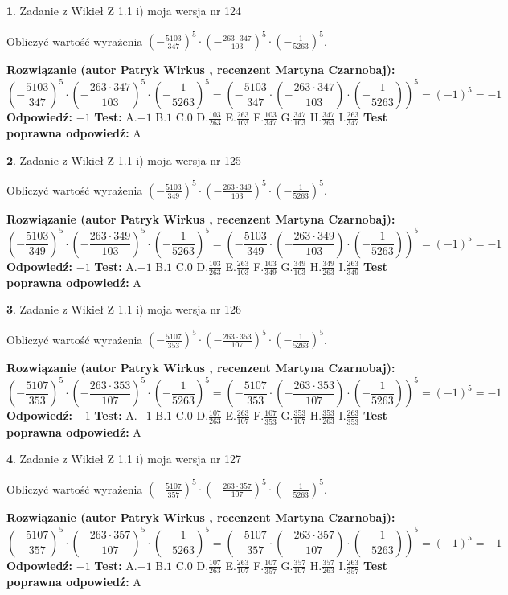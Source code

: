 \documentclass[12pt, a4paper]{article}
\theoremstyle{definition} %
\newtheorem{zad}{}
\newcommand{\zadStart}[1]{\begin{zad}#1\newline}
\newcommand{\zadStop}{\end{zad}}
\newcommand{\rozwStart}[2]{\noindent \textbf{Rozwiązanie (autor #1 , recenzent #2): }\newline}
\newcommand{\rozwStop}{\newline}
\newcommand{\odpStart}{\noindent \textbf{Odpowiedź:}\newline}
\newcommand{\odpStop}{\newline}
\newcommand{\testStart}{\noindent \textbf{Test:}\newline}
\newcommand{\testStop}{\newline}
\newcommand{\kluczStart}{\noindent \textbf{Test poprawna odpowiedź:}\newline}
\newcommand{\kluczStop}{\newline}
\begin{document}
\zadStart{Zadanie z Wikieł Z 1.1 i) moja wersja nr 124}

Obliczyć wartość wyrażenia $(-\frac{5103}{347})^{5} \cdot (-\frac{263 \cdot 347}{103})^{5} \cdot (-\frac{1}{5263})^{5}$.
\zadStop
\rozwStart{Patryk Wirkus}{Martyna Czarnobaj}
$$(-\frac{5103}{347})^{5} \cdot (-\frac{263 \cdot 347}{103})^{5} \cdot (-\frac{1}{5263})^{5} = (-\frac{5103}{347} \cdot (-\frac{263 \cdot 347}{103}) \cdot (-\frac{1}{5263}))^{5} = (-1)^{5} = -1$$
\rozwStop
\odpStart
$-1$
\odpStop
\testStart
A.$-1$ B.$1$ C.$0$ D.$\frac{103}{263}$ E.$\frac{263}{103}$
F.$\frac{103}{347}$ G.$\frac{347}{103}$
H.$\frac{347}{263}$
I.$\frac{263}{347}$
\testStop
\kluczStart
A
\kluczStop



\zadStart{Zadanie z Wikieł Z 1.1 i) moja wersja nr 125}

Obliczyć wartość wyrażenia $(-\frac{5103}{349})^{5} \cdot (-\frac{263 \cdot 349}{103})^{5} \cdot (-\frac{1}{5263})^{5}$.
\zadStop
\rozwStart{Patryk Wirkus}{Martyna Czarnobaj}
$$(-\frac{5103}{349})^{5} \cdot (-\frac{263 \cdot 349}{103})^{5} \cdot (-\frac{1}{5263})^{5} = (-\frac{5103}{349} \cdot (-\frac{263 \cdot 349}{103}) \cdot (-\frac{1}{5263}))^{5} = (-1)^{5} = -1$$
\rozwStop
\odpStart
$-1$
\odpStop
\testStart
A.$-1$ B.$1$ C.$0$ D.$\frac{103}{263}$ E.$\frac{263}{103}$
F.$\frac{103}{349}$ G.$\frac{349}{103}$
H.$\frac{349}{263}$
I.$\frac{263}{349}$
\testStop
\kluczStart
A
\kluczStop



\zadStart{Zadanie z Wikieł Z 1.1 i) moja wersja nr 126}

Obliczyć wartość wyrażenia $(-\frac{5107}{353})^{5} \cdot (-\frac{263 \cdot 353}{107})^{5} \cdot (-\frac{1}{5263})^{5}$.
\zadStop
\rozwStart{Patryk Wirkus}{Martyna Czarnobaj}
$$(-\frac{5107}{353})^{5} \cdot (-\frac{263 \cdot 353}{107})^{5} \cdot (-\frac{1}{5263})^{5} = (-\frac{5107}{353} \cdot (-\frac{263 \cdot 353}{107}) \cdot (-\frac{1}{5263}))^{5} = (-1)^{5} = -1$$
\rozwStop
\odpStart
$-1$
\odpStop
\testStart
A.$-1$ B.$1$ C.$0$ D.$\frac{107}{263}$ E.$\frac{263}{107}$
F.$\frac{107}{353}$ G.$\frac{353}{107}$
H.$\frac{353}{263}$
I.$\frac{263}{353}$
\testStop
\kluczStart
A
\kluczStop



\zadStart{Zadanie z Wikieł Z 1.1 i) moja wersja nr 127}

Obliczyć wartość wyrażenia $(-\frac{5107}{357})^{5} \cdot (-\frac{263 \cdot 357}{107})^{5} \cdot (-\frac{1}{5263})^{5}$.
\zadStop
\rozwStart{Patryk Wirkus}{Martyna Czarnobaj}
$$(-\frac{5107}{357})^{5} \cdot (-\frac{263 \cdot 357}{107})^{5} \cdot (-\frac{1}{5263})^{5} = (-\frac{5107}{357} \cdot (-\frac{263 \cdot 357}{107}) \cdot (-\frac{1}{5263}))^{5} = (-1)^{5} = -1$$
\rozwStop
\odpStart
$-1$
\odpStop
\testStart
A.$-1$ B.$1$ C.$0$ D.$\frac{107}{263}$ E.$\frac{263}{107}$
F.$\frac{107}{357}$ G.$\frac{357}{107}$
H.$\frac{357}{263}$
I.$\frac{263}{357}$
\testStop
\kluczStart
A
\kluczStop
\end{document}
